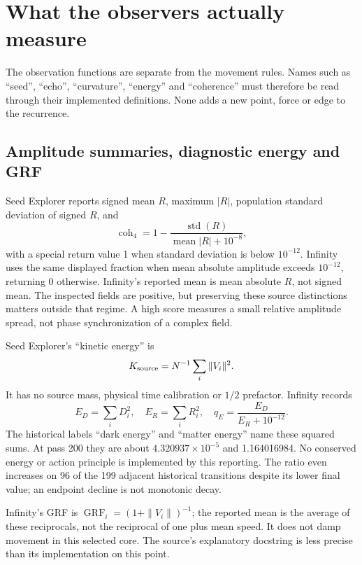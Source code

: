 \documentclass[11pt,a4paper]{article}
\begin{document}
\section{What the observers actually measure}
\label{sec:observers}
The observation functions are separate from the movement rules. Names such as ``seed'', ``echo'', ``curvature'', ``energy'' and ``coherence'' must therefore be read through their implemented definitions. None adds a new point, force or edge to the recurrence.

\subsection{Amplitude summaries, diagnostic energy and GRF}
Seed Explorer reports signed mean $R$, maximum $|R|$, population standard deviation of signed $R$, and
\begin{equation}
\operatorname{coh}_4=1-\frac{\operatorname{std}(R)}{\operatorname{mean}|R|+10^{-8}},\label{eq:coh4}
\end{equation}
with a special return value 1 when standard deviation is below $10^{-12}$. Infinity uses the same displayed fraction when mean absolute amplitude exceeds $10^{-12}$, returning 0 otherwise. Infinity's reported mean is mean absolute $R$, not signed mean. The inspected fields are positive, but preserving these source distinctions matters outside that regime. A high score measures a small relative amplitude spread, not phase synchronization of a complex field.

Seed Explorer's ``kinetic energy'' is
\begin{equation}
K_{\rm source}=N^{-1}\sum_i\|V_i\|^2.\label{eq:K}
\end{equation}
It has no source mass, physical time calibration or $1/2$ prefactor. Infinity records
\begin{equation}
E_D=\sum_iD_i^2,\quad E_R=\sum_iR_i^2,\quad q_E=\frac{E_D}{E_R+10^{-12}}.\label{eq:energy}
\end{equation}
The historical labels ``dark energy'' and ``matter energy'' name these squared sums. At pass 200 they are about $4.320937\times10^{-5}$ and 1.164016984. No conserved energy or action principle is implemented by this reporting. The ratio even increases on 96 of the 199 adjacent historical transitions despite its lower final value; an endpoint decline is not monotonic decay.

Infinity's GRF is $\operatorname{GRF}_i=(1+\|V_i\|)^{-1}$; the reported mean is the average of these reciprocals, not the reciprocal of one plus mean speed. It does not damp movement in this selected core. The source's explanatory docstring is less precise than its implementation on this point.
\end{document}
